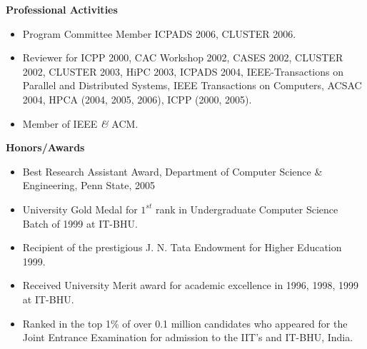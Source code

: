 \documentclass{article}
\begin{document}

	\vspace*{-0.1truein}
	\large \textbf{Professional Activities}
	\normalsize
	\vspace*{-0.2truein}
	\begin{center}
	\begin{itemize}
	\item{Program Committee Member ICPADS 2006, CLUSTER 2006.}
	 \item{Reviewer for ICPP 2000, CAC Workshop 2002, CASES 2002, CLUSTER 2002, CLUSTER 2003, HiPC 2003,
	 ICPADS 2004, IEEE-Transactions on Parallel and Distributed Systems,
	 IEEE Transactions on Computers, ACSAC 2004, HPCA (2004, 2005, 2006), ICPP (2000, 2005).}
	 \item{Member of IEEE \emph{\&} ACM.}
	\end{itemize}
	\end{center}


  \vspace*{-0.1truein}
  \large \textbf{Honors/Awards}
  \normalsize
  \vspace*{-0.2truein}
  \begin{center}
  \begin{itemize}
  \item {Best Research Assistant Award, Department of Computer Science \& Engineering, Penn State, 2005}
  \item {University Gold Medal for $1^{st}$ rank in Undergraduate Computer Science Batch of 1999 at IT-BHU.}
  \item {Recipient of the prestigious J. N. Tata Endowment for Higher Education 1999.} 
  \item {Received University Merit award for academic excellence in 1996, 1998, 1999 at IT-BHU.}
  \item {Ranked in the top 1\% of over 0.1 million candidates who appeared for the Joint Entrance 
  Examination for admission to the IIT's and IT-BHU, India.}
  \end{itemize}
  \end{center}
\end{document}
